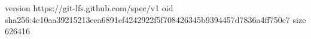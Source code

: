 version https://git-lfs.github.com/spec/v1
oid sha256:4c10aa39215213eea6891ef4242922f5f708426345b9394457d7836a4ff750c7
size 626416
